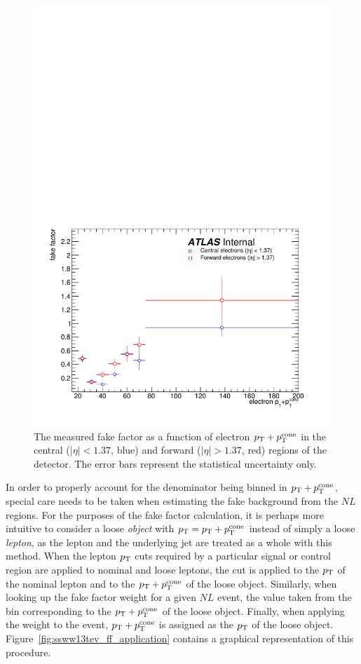 \begin{figure}[htbp]
  \centering
  \includegraphics[width=.6\textwidth]{figs/ssww_13tev/backgrounds/ff/elec_ff}
  \caption{The measured fake factor as a function of electron $p_{\mathrm{T}}+p_{\mathrm{T}}^{\textrm{cone}}$ in the central ($|\eta|<1.37$, blue) and forward ($|\eta| > 1.37$, red) regions of the detector.  The error bars represent the statistical uncertainty only.}
  \label{fig:ssww13tev_ff_elec}
\end{figure}

In order to properly account for the denominator being binned in $p_{\mathrm{T}}+p_{\mathrm{T}}^{\textrm{cone}}$, special care needs to be taken when estimating the fake background from the $NL$ regions.
For the purposes of the fake factor calculation, it is perhaps more intuitive to consider a loose \emph{object} with $p_{\mathrm{T}}=p_{\mathrm{T}}+p_{\mathrm{T}}^{\textrm{cone}}$ instead of simply a loose \emph{lepton}, as the lepton and the underlying jet are treated as a whole with this method.
When the lepton $p_{\mathrm{T}}$ cuts required by a particular signal or control region are applied to nominal and loose leptons, the cut is applied to the $p_{\mathrm{T}}$ of the nominal lepton and to the $p_{\mathrm{T}}+p_{\mathrm{T}}^{\textrm{cone}}$ of the loose object.
Similarly, when looking up the fake factor weight for a given $NL$ event, the value taken from the bin corresponding to the $p_{\mathrm{T}}+p_{\mathrm{T}}^{\textrm{cone}}$ of the loose object.
Finally, when applying the weight to the event, $p_{\mathrm{T}}+p_{\mathrm{T}}^{\textrm{cone}}$ is assigned as the $p_{\mathrm{T}}$ of the loose object.
Figure~\ref{fig:ssww13tev_ff_application} contains a graphical representation of this procedure.

